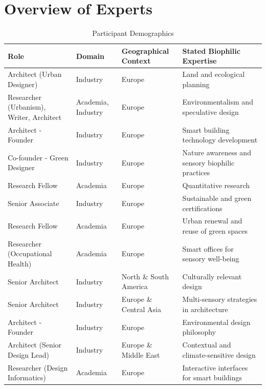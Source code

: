 \section{Overview of Experts}
\label{appx-participant-demographics}
\begin{table}[!ht]
\centering
\caption{Participant Demographics}
\label{tab:participant-demographics}
\begin{tabular}{|l|l|l|l|}
\midrule
\textbf{Role} & \textbf{Domain} & \textbf{Geographical Context} & \textbf{Stated Biophilic Expertise} \\
\midrule
Architect (Urban Designer) & Industry  & Europe & Land and ecological planning \\
Researcher (Urbanism),  Writer, Architect & Academia, Industry  & Europe & Environmentalism and speculative design \\
Architect - Founder & Industry  & Europe & Smart building technology development \\
Co-founder - Green Designer & Industry  & Europe & Nature awareness and sensory biophilic practices  \\
Research Fellow & Academia & Europe & Quantitative research\\
Senior Associate & Industry  & Europe & Sustainable and green certifications \\
Research Fellow & Academia & Europe & Urban renewal and reuse of green spaces \\
Researcher (Occupational Health)  & Academia & Europe & Smart offices for sensory well-being \\
Senior Architect & Industry & North \& South America & Culturally relevant design  \\
Senior Architect & Industry  & Europe \& Central Asia & Multi-sensory strategies in architecture \\
Architect - Founder & Industry  & Europe & Environmental design philosophy\\
Architect (Senior Design Lead) & Industry & Europe \& Middle East & Contextual and climate-sensitive design \\
Researcher (Design Informatics) & Academia & Europe & Interactive interfaces for smart buildings\\
\bottomrule
\end{tabular}
\end{table}

